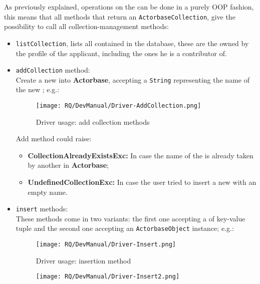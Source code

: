 \documentclass{scalatekids-article}
\begin{document}
As previously explained, operations on the  can be done in a purely
OOP fashion, this means that all methods that return an \verb=ActorbaseCollection=,
give the possibility to call all collection-management methods:

\begin{itemize}
\item \verb=listCollection=, lists all 
  contained in the database, these are the 
  owned by the profile of the applicant, including the ones he is a contributor of.
\item \verb=addCollection= method:\\ Create a new  into \textbf{Actorbase}, accepting a \verb=String=
  representing the name of the new ;
  e.g.:
  \begin{figure}[H]
    \begin{center}
      \texttt{[image: RQ/DevManual/Driver-AddCollection.png]}
      \caption{Driver usage: add collection  methods}
    \end{center}
  \end{figure}
  Add  method could raise:
  \begin{itemize}
  \item \textbf{CollectionAlreadyExistsExc:} In case the name of the  is already taken by another  in \textbf{Actorbase};
  \item \textbf{UndefinedCollectionExc:} In case the user tried to insert a new  with an empty name.
  \end{itemize}
\item \verb=insert= methods:\\ These methods come in two variants: the first one accepting
  a  of key-value tuple and the second
  one accepting an
  \verb=ActorbaseObject= instance;
  e.g.:
  \begin{figure}[H]
    \begin{center}
      \texttt{[image: RQ/DevManual/Driver-Insert.png]}
      \caption{Driver usage: insertion method}
    \end{center}
  \end{figure}
  \begin{figure}[H]
    \begin{center}
      \texttt{[image: RQ/DevManual/Driver-Insert2.png]}

\end{center}
\end{figure}
\end{itemize}
\end{document}
